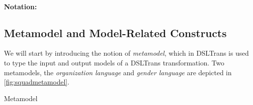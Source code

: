 % 



\paragraph{\textbf{Notation:}}

\subsection{Metamodel and Model-Related Constructs}
\label{sec:DSLTrans_formal}


We will start by introducing the notion of \emph{metamodel}, which in DSLTrans is used to type the input and output models of a DSLTrans transformation.  Two metamodels, the \emph{organization language} and \emph{gender language} are depicted in \cref{fig:squadmetamodel}.

\begin{definition}{Metamodel\\}
\label{def:metamodel}
\end{definition}


